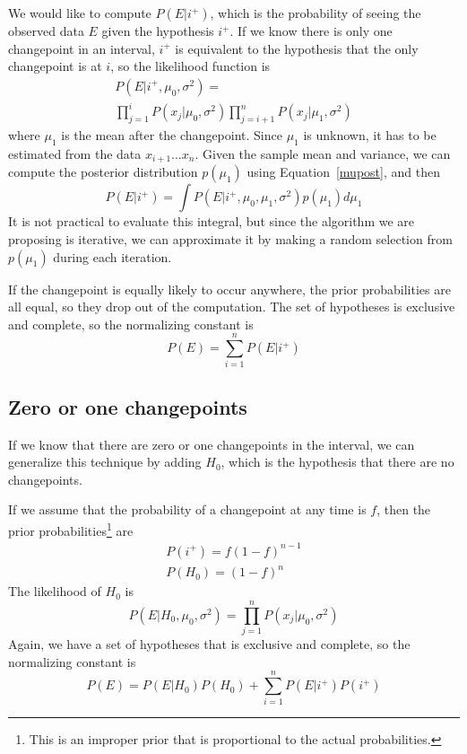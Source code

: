 \documentclass[twocolumn,11pt]{article}
\begin{document}
We would like to compute $P(E|i^+)$, which is the probability of
seeing the observed data $E$ given the hypothesis $i^+$.
If we know there is only one changepoint in an interval,
$i^+$ is equivalent to the hypothesis that the only
changepoint is at $i$, so the likelihood function is
%
\begin{multline}
P(E|i^+, \mu_0, \sigma^2) = \\
\prod_{j=1}^{i} P(x_j | \mu_0, \sigma^2) 
\prod_{j=i+1}^{n} P(x_j | \mu_1, \sigma^2)
\label{likelihood}
\end{multline} 
%
where $\mu_1$ is the mean after the changepoint.  Since $\mu_1$
is unknown, it has to be estimated from the data $x_{i+1} \ldots x_n$.  Given
the sample mean and variance, we can compute the posterior
distribution $p(\mu_1)$ using Equation~\ref{mupost}, and then
%
\begin{equation}
P(E|i^+) = \int P(E|i^+, \mu_0, \mu_1, \sigma^2) p(\mu_1) d \mu_1
\end{equation}
%
It is not practical to evaluate this integral, but since the algorithm
we are proposing is iterative, we can approximate it by
making a random selection from $p(\mu_1)$
during each iteration.

If the changepoint is equally likely to occur anywhere, the prior
probabilities are all equal, so they drop out of the computation.
The set of hypotheses is exclusive and complete, so the normalizing
constant is
%
\begin{equation}
P(E) = \sum_{i=1}^n P(E|i^+)
\end{equation}


\subsection{Zero or one changepoints}
\label{likefun0}

If we know that there are zero or one changepoints
in the interval, we can generalize this technique by adding
$H_0$, which is the hypothesis that there are no changepoints.

If we assume that the probability of a changepoint at any time is $f$,
then the prior probabilities\footnote{This is an improper
prior that is proportional to the actual probabilities.} are
%
\begin{equation}
\begin{gathered}
P(i^+) = f (1-f)^{n-1} \\
P(H_0) = (1-f)^n
\end{gathered}
\end{equation}
%
The likelihood of $H_0$ is
%
\begin{equation}
P(E|H_0,\mu_0, \sigma^2) = \prod_{j=1}^{n} P(x_j | \mu_0, \sigma^2) 
\end{equation}
%
Again, we have a set of hypotheses that is 
exclusive and complete, so the normalizing constant is
%
\begin{equation}
P(E) = P(E|H_0) P(H_0) + \sum_{i=1}^n P(E|i^+) P(i^+)
\end{equation}
%
\end{document}
